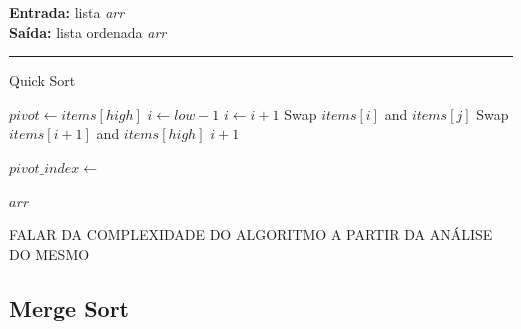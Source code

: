\documentclass[conference]{IEEEtran}
\begin{document}
\begin{algorithm}[H]
    \raggedright
    \vspace{.1em}
    \textbf{Entrada:} lista \textit{arr} \\
    \textbf{Saída:} lista ordenada \textit{arr} \\
    \vspace{.5em}
    \hrule 
    \caption{Quick Sort}
    \begin{algorithmic}[1]
            \State $pivot \gets items[high]$
            \State $i \gets low - 1$
                    \State $i \gets i + 1$
                    \State Swap $items[i]$ and $items[j]$
                \EndIf
            \EndFor
            \State Swap $items[i + 1]$ and $items[high]$
            \State \Return $i + 1$
        \EndFunction
    
                \State $pivot\_index \gets$ 
                \State {}
                \State {}
            \EndIf
        \EndFunction
    
        \State {}
        \State \Return $arr$
    \end{algorithmic}
\end{algorithm}

FALAR DA COMPLEXIDADE DO ALGORITMO A PARTIR DA ANÁLISE DO MESMO

\subsection{Merge Sort}
\end{document}
